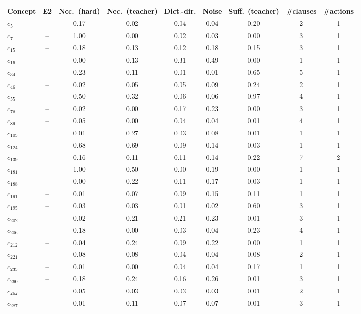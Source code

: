 \begin{tabular}{lcccccccc}
\toprule
Concept & E2 & Nec.\ (hard) & Nec.\ (teacher) & Dict.-dir. & Noise & Suff.\ (teacher) & \#clauses & \#actions \\
\midrule
$c_{5}$ & -- & 0.17 & 0.02 & 0.04 & 0.04 & 0.20 & 2 & 1 \\
$c_{7}$ & -- & 1.00 & 0.00 & 0.02 & 0.03 & 0.00 & 3 & 1 \\
$c_{15}$ & -- & 0.18 & 0.13 & 0.12 & 0.18 & 0.15 & 3 & 1 \\
$c_{16}$ & -- & 0.00 & 0.13 & 0.31 & 0.49 & 0.00 & 1 & 1 \\
$c_{34}$ & -- & 0.23 & 0.11 & 0.01 & 0.01 & 0.65 & 5 & 1 \\
$c_{46}$ & -- & 0.02 & 0.05 & 0.05 & 0.09 & 0.24 & 2 & 1 \\
$c_{55}$ & -- & 0.50 & 0.32 & 0.06 & 0.06 & 0.97 & 4 & 1 \\
$c_{78}$ & -- & 0.02 & 0.00 & 0.17 & 0.23 & 0.00 & 3 & 1 \\
$c_{89}$ & -- & 0.05 & 0.00 & 0.04 & 0.04 & 0.01 & 4 & 1 \\
$c_{103}$ & -- & 0.01 & 0.27 & 0.03 & 0.08 & 0.01 & 1 & 1 \\
$c_{124}$ & -- & 0.68 & 0.69 & 0.09 & 0.14 & 0.03 & 1 & 1 \\
$c_{139}$ & -- & 0.16 & 0.11 & 0.11 & 0.14 & 0.22 & 7 & 2 \\
$c_{181}$ & -- & 1.00 & 0.50 & 0.00 & 0.19 & 0.00 & 1 & 1 \\
$c_{188}$ & -- & 0.00 & 0.22 & 0.11 & 0.17 & 0.03 & 1 & 1 \\
$c_{191}$ & -- & 0.01 & 0.07 & 0.09 & 0.15 & 0.11 & 1 & 1 \\
$c_{195}$ & -- & 0.03 & 0.03 & 0.01 & 0.02 & 0.60 & 3 & 1 \\
$c_{202}$ & -- & 0.02 & 0.21 & 0.21 & 0.23 & 0.01 & 3 & 1 \\
$c_{206}$ & -- & 0.18 & 0.00 & 0.03 & 0.04 & 0.23 & 4 & 1 \\
$c_{212}$ & -- & 0.04 & 0.24 & 0.09 & 0.22 & 0.00 & 1 & 1 \\
$c_{221}$ & -- & 0.08 & 0.08 & 0.04 & 0.04 & 0.08 & 2 & 1 \\
$c_{233}$ & -- & 0.01 & 0.00 & 0.04 & 0.04 & 0.17 & 1 & 1 \\
$c_{260}$ & -- & 0.18 & 0.24 & 0.16 & 0.26 & 0.01 & 3 & 1 \\
$c_{262}$ & -- & 0.05 & 0.03 & 0.03 & 0.03 & 0.01 & 2 & 1 \\
$c_{287}$ & -- & 0.01 & 0.11 & 0.07 & 0.07 & 0.01 & 3 & 1 \\

\end{tabular}
